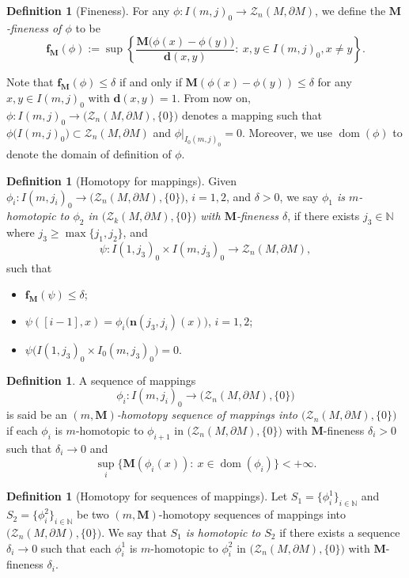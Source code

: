 \documentclass[10pt]{amsart}
\theoremstyle{definition}
\newtheorem{definition}[theorem]{Definition}
\theoremstyle{remark}
\numberwithin{equation}{section}
\newcommand{\N}{\mathbb{N}}
\newcommand{\de}{\delta}
\newcommand{\Z}{\mathcal{Z}}
\newcommand{\M}{\mathbf{M}}
\newcommand{\mf}{\mathbf{f}}
\newcommand{\n}{\mathbf{n}}
\newcommand{\md}{\mathbf{d}}
\newcommand{\dom}{\operatorname{dom}}
\begin{document}
\begin{definition}[Fineness]
\label{D:fineness}
For any $\phi: I(m, j)_{0}\rightarrow\Z_{n}(M,\partial M)$, we define the \emph{$\M$-fineness of $\phi$} to be
\begin{equation*}
\mf_\M(\phi):=\sup \left\{\frac{\M\big(\phi(x)-\phi(y)\big)}{\md(x, y)}:\ x, y\in I(m, j)_{0}, x\neq y \right\}.
\end{equation*}
\end{definition}

Note that $\mf_\M(\phi) \leq \de$ if and only if $\M(\phi(x)-\phi(y)) \leq \de$ for any $x,y \in I(m,j)_0$ with $\md(x,y)=1$. From now on, $\phi: I(m, j)_{0}\rightarrow\big(\Z_{n}(M, \partial M), \{0\}\big)$ denotes a mapping such that $\phi\big(I(m, j)_{0}\big)\subset\Z_{n}(M, \partial M)$ and $\phi|_{I_{0}(m, j)_{0}}=0$. Moreover, we use $\dom(\phi)$ to denote the domain of definition of $\phi$.

\begin{definition}[Homotopy for mappings]
\label{D:homotopy-maps}
Given $\phi_{i}: I(m, j_{i})_{0}\rightarrow\big(\Z_{n}(M, \partial M), \{0\}\big)$, $i=1, 2$, and $\de>0$, we say \emph{$\phi_{1}$ is $m$-homotopic to $\phi_{2}$ in $\big(\Z_{k}(M, \partial M), \{0\}\big)$ with $\M$-fineness $\de$}, if there exists $ j_{3}\in\N$ where $j_{3}\geq\max\{j_{1}, j_{2}\}$, and
$$\psi: I(1, j_{3})_{0}\times I(m, j_{3})_{0}\rightarrow \Z_{n}(M, \partial M),$$
such that
\begin{itemize}
\item $\mf_\M(\psi)\leq \de$;
\item $\psi([i-1], x)=\phi_{i}\big(\n(j_{3}, j_{i})(x)\big)$, $i=1, 2$;
\item $\psi\big(I(1, j_{3})_{0}\times I_{0}(m, j_{3})_{0}\big)=0$.
\end{itemize}
\end{definition}

\begin{definition}
\label{D:(m, M)-homotopy-seq}
A sequence of mappings 
$$\phi_{i}: I(m, j_{i})_{0}\rightarrow\big(\Z_{n}(M, \partial M), \{0\}\big)$$
is said be an \emph{$(m, \M)$-homotopy sequence of mappings into $\big(\Z_{n}(M, \partial M), \{0\}\big)$} if each $\phi_{i}$ is $m$-homotopic to $\phi_{i+1}$ in $\big(\Z_{n}(M, \partial M), \{0\}\big)$ with $\M$-fineness $\de_{i}>0$ such that $\de_i \to 0$ and
\[ \sup_{i}\big\{\M(\phi_{i}(x)):\ x\in \dom(\phi_i) \big\}<+\infty. \]
\end{definition}

\begin{definition}[Homotopy for sequences of mappings]
\label{D:homotopy-seq}
Let $S_{1}=\{\phi^{1}_{i}\}_{i\in\N}$ and $S_{2}=\{\phi^{2}_{i}\}_{i\in\N}$ be two $(m, \M)$-homotopy sequences of mappings into $\big(\Z_{n}(M, \partial M), \{0\}\big)$. We say that \emph{$S_{1}$ is homotopic to  $S_{2}$} if there exists a sequence $\de_{i} \to 0$ such that each $\phi^{1}_{i}$ is $m$-homotopic to $\phi^{2}_{i}$ in $\big(\Z_{n}(M, \partial M), \{0\}\big)$ with $\M$-fineness $\de_{i}$.
\end{definition}
\end{document}
